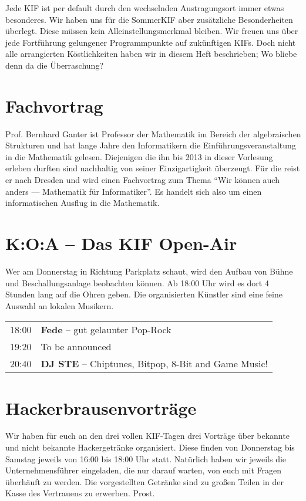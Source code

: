 
Jede KIF ist per default durch den wechselnden Austragungsort immer etwas besonderes.
Wir haben uns für die SommerKIF aber zusätzliche Besonderheiten überlegt.
Diese müssen kein Alleinstellungsmerkmal bleiben.
Wir freuen uns über jede Fortführung gelungener Programmpunkte auf zukünftigen KIFs.
Doch nicht alle arrangierten Köstlichkeiten haben wir in diesem Heft beschrieben; Wo bliebe denn da die Überraschung?

\section*{Fachvortrag}
Prof. Bernhard Ganter ist Professor der Mathematik im Bereich der algebraischen Strukturen und hat lange Jahre den Informatikern die Einführungsveranstaltung in die Mathematik gelesen.
Diejenigen die ihn bis 2013 in dieser Vorlesung erleben durften sind nachhaltig von seiner Einzigartigkeit überzeugt.
Für die \KIF{} reist er nach Dresden und wird einen Fachvortrag zum Thema \enquote{Wir können auch anders --- Mathematik für Informatiker}.
Es handelt sich also um einen informatischen Ausflug in die Mathematik.

\section*{K:O:A -- Das KIF Open-Air}
Wer am Donnerstag in Richtung Parkplatz schaut, wird den Aufbau von Bühne und Beschallungsanlage beobachten können.
Ab 18:00 Uhr wird es dort 4 Stunden lang auf die Ohren geben.
Die organisierten Künstler sind eine feine Auswahl an lokalen Musikern.
\vspace{10pt}

\begin{tabular}{rl}
    18:00 & \textbf{Fede} -- gut gelaunter Pop-Rock \\

    19:20 & To be announced\\

    20:40 & \textbf{DJ STE} -- Chiptunes, Bitpop, 8-Bit and Game Music!
\end{tabular}

\section*{Hackerbrausenvorträge}
Wir haben für euch an den drei vollen KIF-Tagen drei Vorträge über bekannte und nicht bekannte Hackergetränke organisiert.
Diese finden von Donnerstag bis Samstag jeweils von 16:00 bis 18:00 Uhr statt.
Natürlich haben wir jeweils die Unternehmensführer eingeladen, die nur darauf warten, von euch mit Fragen überhäuft zu werden.
Die vorgestellten Getränke sind zu großen Teilen in der Kasse des Vertrauens zu erwerben. Prost.

